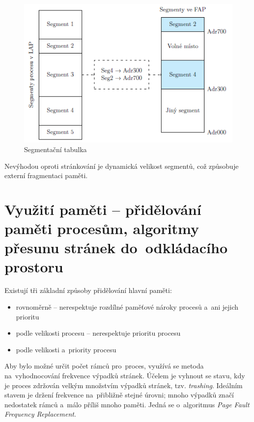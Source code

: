 \begin{figure}[ht]
	\centering
	\includegraphics[scale=1]{images/mem_segment_table.png}
	\caption{Segmentační tabulka}
	\label{mem_segment_table}
\end{figure}

Nevýhodou oproti stránkování je dynamická velikost segmentů, což způsobuje externí fragmentaci paměti.


\clearpage
\section{Využití paměti -- přidělování paměti procesům, algoritmy přesunu stránek do~odkládacího prostoru}

Existují tři základní způsoby přidělování hlavní paměti:
\begin{itemize}[noitemsep]
	\item rovnoměrně -- nerespektuje rozdílné paměťové nároky procesů a~ani jejich prioritu
	\item podle velikosti procesu -- nerespektuje prioritu procesu
	\item podle velikosti a~priority procesu
\end{itemize}

Aby bylo možné určit počet rámců pro~proces, využívá se metoda na~vyhodnocování frekvence výpadků stránek. Účelem je vyhnout se stavu, kdy je proces zdržován velkým množstvím výpadků stránek, tzv. \emph{trashing}. Ideálním stavem je držení frekvence na~přibližně stejné úrovni; mnoho výpadků značí nedostatek rámců a~málo příliš mnoho paměti. Jedná se o~algoritmus \emph{Page Fault Frequency Replacement}.

